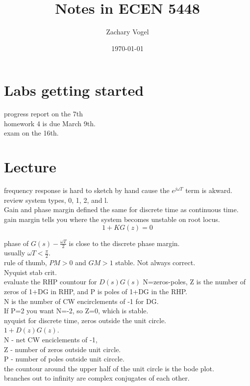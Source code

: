 \documentclass{article}
\author{Zachary Vogel}
\date{\today}
\title{Notes in ECEN 5448}
\begin{document}
\maketitle


\section*{Labs getting started}
progress report on the 7th\\
homework 4 is due March 9th.\\
exam on the 16th.\\

\section*{Lecture}
frequency response is hard to sketch by hand cause the $e^{j\omega T}$ term is akward.\\
review system types, 0, 1, 2, and l.\\

Gain and phase margin defined the same for discrete time as continuous time.\\

gain margin tells you where the system becomes unstable on root locus.\\

\[1+KG(z)=0\]

phase of $G(s)-\frac{\omega T}{2}$ is close to the discrete phase margin.\\
usually $\omega T<\frac{\pi}{2}$.\\

rule of thumb, $PM>0$ and $GM>1$ stable. Not always correct.\\

Nyquist stab crit.\\
evaluate the RHP countour for $D(s)G(s)$ N=zeros-poles, Z is the number of zeros of 1+DG in RHP, and P is poles of 1+DG in the RHP.\\
N is the number of CW encirclements of -1 for DG.\\
If P=2 you want N=-2, so Z=0, which is stable.\\

nyquist for discrete time, zeros outside the unit circle.\\
$1+D(z)G(z)$.\\
N - net CW enciclements of -1,\\
Z - number of zeros outside unit circle.\\
P - number of poles outside unit circcle.\\
the countour around the upper half of the unit circle is the bode plot.\\
branches out to infinity are complex conjugates of each other.\\
\end{document}
